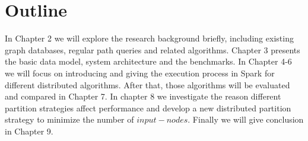 \section{Outline}
In Chapter 2 we will explore the research background briefly, including existing graph databases, regular path queries and related algorithms. Chapter 3 presents the basic data model, system architecture and the benchmarks. In Chapter 4-6 we will focus on introducing and giving the execution process in Spark for different distributed algorithms. After that, those algorithms will be evaluated and compared in Chapter 7. In chapter 8 we investigate the reason different partition strategies affect performance and develop a new distributed partition strategy to minimize the number of $input-nodes$. Finally we will give conclusion in Chapter 9.